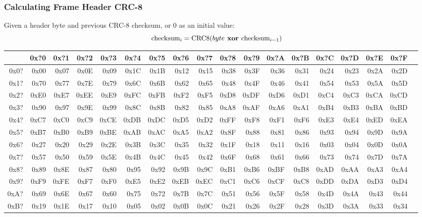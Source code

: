 \subsubsection{Calculating Frame Header CRC-8}
Given a header byte and previous CRC-8 checksum,
or 0 as an initial value:
\begin{equation*}
\text{checksum}_i = \text{CRC8}(byte\textbf{ xor }\text{checksum}_{i - 1})
\end{equation*}
\begin{table}[h]
{\ttfamily
\begin{tabular}{|r||r|r|r|r|r|r|r|r|r|r|r|r|r|r|r|r|r|}
\hline
 & 0x?0 & 0x?1 & 0x?2 & 0x?3 & 0x?4 & 0x?5 & 0x?6 & 0x?7 & 0x?8 & 0x?9 & 0x?A & 0x?B & 0x?C & 0x?D & 0x?E & 0x?F \\
\hline
0x0? & 0x00 & 0x07 & 0x0E & 0x09 & 0x1C & 0x1B & 0x12 & 0x15 & 0x38 & 0x3F & 0x36 & 0x31 & 0x24 & 0x23 & 0x2A & 0x2D \\
0x1? & 0x70 & 0x77 & 0x7E & 0x79 & 0x6C & 0x6B & 0x62 & 0x65 & 0x48 & 0x4F & 0x46 & 0x41 & 0x54 & 0x53 & 0x5A & 0x5D \\
0x2? & 0xE0 & 0xE7 & 0xEE & 0xE9 & 0xFC & 0xFB & 0xF2 & 0xF5 & 0xD8 & 0xDF & 0xD6 & 0xD1 & 0xC4 & 0xC3 & 0xCA & 0xCD \\
0x3? & 0x90 & 0x97 & 0x9E & 0x99 & 0x8C & 0x8B & 0x82 & 0x85 & 0xA8 & 0xAF & 0xA6 & 0xA1 & 0xB4 & 0xB3 & 0xBA & 0xBD \\
0x4? & 0xC7 & 0xC0 & 0xC9 & 0xCE & 0xDB & 0xDC & 0xD5 & 0xD2 & 0xFF & 0xF8 & 0xF1 & 0xF6 & 0xE3 & 0xE4 & 0xED & 0xEA \\
0x5? & 0xB7 & 0xB0 & 0xB9 & 0xBE & 0xAB & 0xAC & 0xA5 & 0xA2 & 0x8F & 0x88 & 0x81 & 0x86 & 0x93 & 0x94 & 0x9D & 0x9A \\
0x6? & 0x27 & 0x20 & 0x29 & 0x2E & 0x3B & 0x3C & 0x35 & 0x32 & 0x1F & 0x18 & 0x11 & 0x16 & 0x03 & 0x04 & 0x0D & 0x0A \\
0x7? & 0x57 & 0x50 & 0x59 & 0x5E & 0x4B & 0x4C & 0x45 & 0x42 & 0x6F & 0x68 & 0x61 & 0x66 & 0x73 & 0x74 & 0x7D & 0x7A \\
0x8? & 0x89 & 0x8E & 0x87 & 0x80 & 0x95 & 0x92 & 0x9B & 0x9C & 0xB1 & 0xB6 & 0xBF & 0xB8 & 0xAD & 0xAA & 0xA3 & 0xA4 \\
0x9? & 0xF9 & 0xFE & 0xF7 & 0xF0 & 0xE5 & 0xE2 & 0xEB & 0xEC & 0xC1 & 0xC6 & 0xCF & 0xC8 & 0xDD & 0xDA & 0xD3 & 0xD4 \\
0xA? & 0x69 & 0x6E & 0x67 & 0x60 & 0x75 & 0x72 & 0x7B & 0x7C & 0x51 & 0x56 & 0x5F & 0x58 & 0x4D & 0x4A & 0x43 & 0x44 \\
0xB? & 0x19 & 0x1E & 0x17 & 0x10 & 0x05 & 0x02 & 0x0B & 0x0C & 0x21 & 0x26 & 0x2F & 0x28 & 0x3D & 0x3A & 0x33 & 0x34 \\

\end{tabular}}
\end{table}
